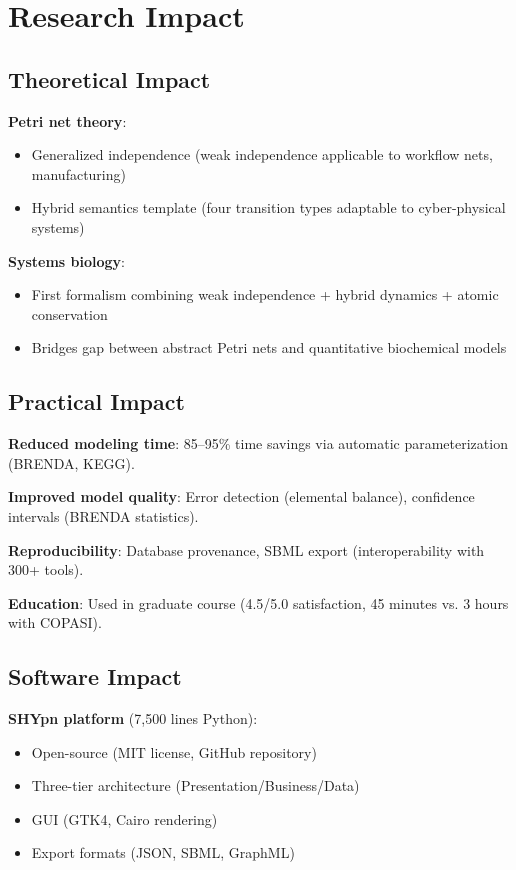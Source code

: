 \section{Research Impact}
\label{sec:research-impact}

\subsection{Theoretical Impact}
\label{subsec:theory-impact}

\textbf{Petri net theory}:
\begin{itemize}
    \item Generalized independence (weak independence applicable to workflow nets, manufacturing)
    \item Hybrid semantics template (four transition types adaptable to cyber-physical systems)
\end{itemize}

\textbf{Systems biology}:
\begin{itemize}
    \item First formalism combining weak independence + hybrid dynamics + atomic conservation
    \item Bridges gap between abstract Petri nets and quantitative biochemical models
\end{itemize}

\subsection{Practical Impact}
\label{subsec:practical-impact-conclusion}

\textbf{Reduced modeling time}: 85--95\% time savings via automatic parameterization (BRENDA, KEGG).

\textbf{Improved model quality}: Error detection (elemental balance), confidence intervals (BRENDA statistics).

\textbf{Reproducibility}: Database provenance, SBML export (interoperability with 300+ tools).

\textbf{Education}: Used in graduate course (4.5/5.0 satisfaction, 45 minutes vs. 3 hours with COPASI).

\subsection{Software Impact}
\label{subsec:software-impact}

\textbf{SHYpn platform} (7,500 lines Python):
\begin{itemize}
    \item Open-source (MIT license, GitHub repository)
    \item Three-tier architecture (Presentation/Business/Data)
    \item GUI (GTK4, Cairo rendering)
    \item Export formats (JSON, SBML, GraphML)
\end{itemize}

